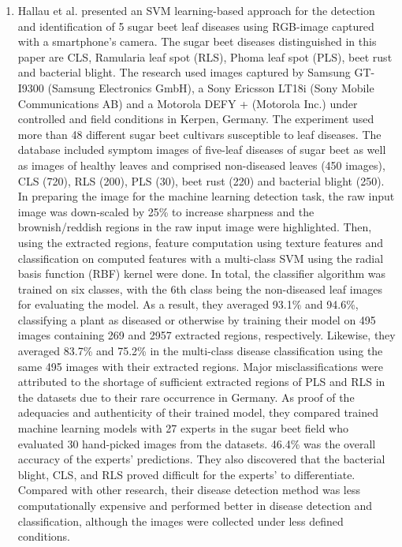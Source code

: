 \begin{enumerate}
\item Hallau et al. \cite{hallau2018automated} presented an SVM learning-based approach for the detection and identification of 5 sugar beet leaf diseases using RGB-image captured with a smartphone’s camera. The sugar beet diseases distinguished in this paper are CLS, Ramularia leaf spot (RLS), Phoma leaf spot (PLS), beet rust and bacterial blight. The research used images captured by Samsung GT-I9300 (Samsung Electronics GmbH), a Sony Ericsson LT18i (Sony Mobile Communications AB) and a Motorola DEFY + (Motorola Inc.) under controlled and field conditions in Kerpen, Germany. The experiment used more than 48 different sugar beet cultivars susceptible to leaf diseases. The database included symptom images of five-leaf diseases of sugar beet as well as images of healthy leaves and comprised non-diseased leaves (450 images), CLS (720), RLS (200), PLS (30), beet rust (220) and bacterial blight (250). In preparing the image for the machine learning detection task, the raw input image was down-scaled by 25\% to increase sharpness and the brownish/reddish regions in the raw input image were highlighted. Then, using the extracted regions, feature computation using texture features and classification on computed features with a multi-class SVM using the radial basis function (RBF) kernel were done. In total, the classifier algorithm was trained on six classes, with the 6th class being the non-diseased leaf images for evaluating the model. As a result, they averaged 93.1\% and 94.6\%, classifying a plant as diseased or otherwise by training their model on 495 images containing 269 and 2957 extracted regions, respectively. Likewise, they averaged 83.7\% and 75.2\% in the multi-class disease classification using the same 495 images with their extracted regions. Major misclassifications were attributed to the shortage of sufficient extracted regions of PLS and RLS in the datasets due to their rare occurrence in Germany.
As proof of the adequacies and authenticity of their trained model, they compared trained machine learning models with 27 experts in the sugar beet field who evaluated 30 hand-picked images from the datasets. 46.4\% was the overall accuracy of the experts’ predictions. They also discovered that the bacterial blight, CLS, and RLS proved difficult for the experts’ to differentiate. Compared with other research, their disease detection method was less computationally expensive and performed better in disease detection and classification, although the images were collected under less defined conditions.



\end{enumerate}
